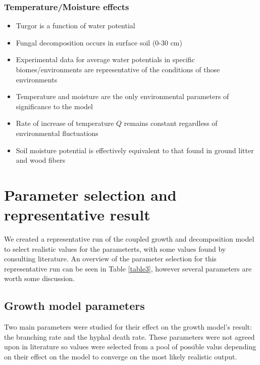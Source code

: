 \documentclass[12pt]{article}
\begin{document}
\begin{multicols}{2}
\subsubsection{Temperature/Moisture effects}
\begin{itemize}
	\item Turgor is a function of water potential
	\item Fungal decomposition occurs in surface soil (0-30 cm)
	\item Experimental data for average water potentials in specific biomes/environments are representative of the conditions of those environments
	\item Temperature and moisture are the only environmental parameters of significance to the model
	\item Rate of increase of temperature $Q$ remains constant regardless of environmental fluctuations
	\item Soil moisture potential is effectively equivalent to that found in ground litter and wood fibers
\end{itemize}

\section{Parameter selection and representative result}
We created a representative run of the coupled growth and decomposition model to select realistic values for the parameterts, with some values found by consulting literature. An overview of the parameter selection for this representative run can be seen in Table \ref{table3}, however several parameters are worth some discussion.
 
\subsection{Growth model parameters}
Two main parameters were studied for their effect on the growth model's result: the branching rate and the hyphal death rate. These parameters were not agreed upon in literature so values were selected from a pool of possible valus depending on their effect on the model to converge on the most likely realistic output. 


\end{multicols}
\end{document}
